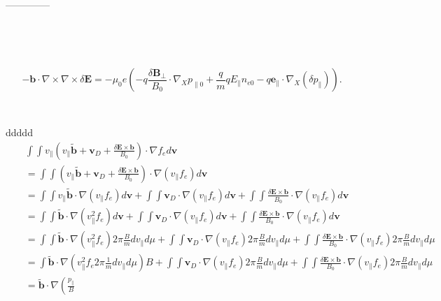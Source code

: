 \documentclass{llncs}
\begin{document}
\

--------------

\

\


\begin{equation}
  -\mathbf{b} \cdot \nabla \times \nabla \times \delta \mathbf{E}= - \mu_0 e
  \left( - q \frac{\delta \mathbf{B}_{\perp}}{B_0} \cdot \nabla_X p_{\parallel
  0} + \frac{q}{m} q E_{\parallel} n_{e 0} - q\mathbf{e}_{\parallel} \cdot
  \nabla_X (\delta p_{\parallel}) \right) .
\end{equation}


\

ddddd
\begin{eqnarray*}
  &  & \int \int v_{\parallel} \left( v_{\parallel} \tilde{\mathbf{b}}
  +\mathbf{v}_D + \frac{\delta \mathbf{E} \times \mathbf{b}}{B_0} \right)
  \cdot \nabla f_e d\mathbf{v}\\
  &  & = \int \int \left( v_{\parallel} \tilde{\mathbf{b}} +\mathbf{v}_D +
  \frac{\delta \mathbf{E} \times \mathbf{b}}{B_0} \right) \cdot \nabla
  (v_{\parallel} f_e) d\mathbf{v}\\
  &  & = \int \int v_{\parallel} \tilde{\mathbf{b}} \cdot \nabla
  (v_{\parallel} f_e) d\mathbf{v}+ \int \int \mathbf{v}_D \cdot \nabla
  (v_{\parallel} f_e) d\mathbf{v}+ \int \int \frac{\delta \mathbf{E} \times
  \mathbf{b}}{B_0} \cdot \nabla (v_{\parallel} f_e) d\mathbf{v}\\
  &  & = \int \int \tilde{\mathbf{b}} \cdot \nabla (v_{\parallel}^2 f_e)
  d\mathbf{v}+ \int \int \mathbf{v}_D \cdot \nabla (v_{\parallel} f_e)
  d\mathbf{v}+ \int \int \frac{\delta \mathbf{E} \times \mathbf{b}}{B_0} \cdot
  \nabla (v_{\parallel} f_e) d\mathbf{v}\\
  &  & = \int \int \tilde{\mathbf{b}} \cdot \nabla (v_{\parallel}^2 f_e) 2
  \pi \frac{B}{m} d v_{\parallel} d \mu + \int \int \mathbf{v}_D \cdot \nabla
  (v_{\parallel} f_e) 2 \pi \frac{B}{m} d v_{\parallel} d \mu + \int \int
  \frac{\delta \mathbf{E} \times \mathbf{b}}{B_0} \cdot \nabla (v_{\parallel}
  f_e) 2 \pi \frac{B}{m} d v_{\parallel} d \mu\\
  &  & = \int \tilde{\mathbf{b}} \cdot \nabla \left( v_{\parallel}^2 f_e 2
  \pi \frac{1}{m} d v_{\parallel} d \mu \right) B + \int \int \mathbf{v}_D
  \cdot \nabla (v_{\parallel} f_e) 2 \pi \frac{B}{m} d v_{\parallel} d \mu +
  \int \int \frac{\delta \mathbf{E} \times \mathbf{b}}{B_0} \cdot \nabla
  (v_{\parallel} f_e) 2 \pi \frac{B}{m} d v_{\parallel} d \mu\\
  &  & = \tilde{\mathbf{b}} \cdot \nabla \left( \frac{p_{\parallel}}{B}

\end{eqnarray*}
\end{document}
